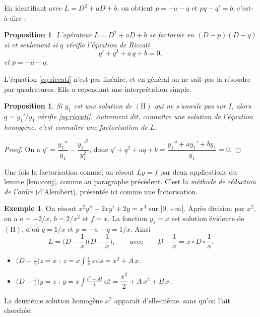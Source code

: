 \documentclass[11pt,a4paper]{article}
\theoremstyle{plain}
\newtheorem{proposition}[theoreme]{Proposition}
\theoremstyle{definition}
\newtheorem{exemple}[theoreme]{Exemple}
\theoremstyle{remark}
\newcommand{\Dx}{D}
\newcommand{\dd}{\mathrm{d}}
\begin{document}
En identifiant avec $L = \Dx^2 + a\Dx + b$, on obtient $p = -a - q$ et $pq - q' = b$, c'est-à-dire :

\begin{proposition}\label{prop:riccati}
L'opérateur $L = \Dx^2 + a\Dx + b$ se factorise en $(\Dx - p)(\Dx - q)$ si et seulement si $q$ vérifie l'\emph{équation de Riccati}
\begin{equation}\label{eq:riccati}
  q' + q^2 + a\,q + b = 0,
\end{equation}
et $p = -a - q$.
\end{proposition}

L'équation \eqref{eq:riccati} n'est pas linéaire, et en général on ne sait pas la résoudre par quadratures. Elle a cependant une interprétation simple.

\begin{proposition}\label{prop:y1}
Si $y_1$ est une solution de $(\mathrm{H})$ qui ne s'annule pas sur $I$, alors $q = y_1'/y_1$ vérifie \eqref{eq:riccati}. Autrement dit, connaître une solution de l'équation homogène, c'est connaître une factorisation de $L$.
\end{proposition}

\begin{proof}
On a $q' = \dfrac{y_1''}{y_1} - \dfrac{y_1'^2}{y_1^2}$, donc $q' + q^2 + aq + b = \dfrac{y_1'' + a y_1' + b y_1}{y_1} = 0$.
\end{proof}

Une fois la factorisation connue, on résout $Ly=f$ par deux applications du lemme \ref{lem:conj}, comme au paragraphe précédent. C'est la \emph{méthode de réduction de l'ordre} (d'Alembert), présentée ici comme une factorisation.

\begin{exemple}\label{ex:var}
On résout $x^2y'' - 2xy' + 2y = x^3$ sur $]0,+\infty[$. Après division par $x^2$, on a $a = -2/x$, $b = 2/x^2$ et $f = x$. La fonction $y_1 = x$ est solution évidente de $(\mathrm{H})$, d'où $q = 1/x$ et $p = -a - q = 1/x$. Ainsi
\[
  L = \Big(\Dx - \frac1x\Big)\Big(\Dx - \frac1x\Big),
  \qquad\text{avec}\qquad \Dx - \frac1x = x\circ \Dx \circ \frac1x .
\]
\begin{itemize}[nosep]
\item $\big(\Dx - \frac1x\big) z = x$ : $z = x\int \frac{1}{s}\, s\,\dd s = x^2 + A\,x$.
\item $\big(\Dx - \frac1x\big) y = z$ : $y = x\int \frac{t^2 + At}{t}\,\dd t = \dfrac{x^3}{2} + A\,x^2 + B\,x$.
\end{itemize}
La deuxième solution homogène $x^2$ apparaît d'elle-même, sans qu'on l'ait cherchée.
\end{exemple}
\end{document}
